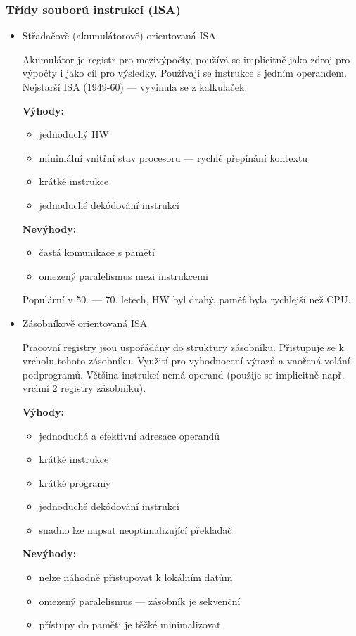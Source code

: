 \subsubsection*{Třídy souborů instrukcí (ISA)}
\begin{itemize}
	\item Střadačově (akumulátorově) orientovaná ISA

	Akumulátor je registr pro mezivýpočty, používá se implicitně jako zdroj pro výpočty i jako cíl pro výsledky. Používají se instrukce s jedním operandem. Nejstarší ISA (1949-60) --- vyvinula se z kalkulaček.
	
	\textbf{Výhody:}
	\begin{itemize}
		\item jednoduchý HW
		\item minimální vnitřní stav procesoru --- rychlé přepínání kontextu
		\item krátké instrukce
		\item jednoduché dekódování instrukcí
	\end{itemize}
	
	\textbf{Nevýhody:}
	\begin{itemize}
		\item častá komunikace s pamětí
		\item omezený paralelismus mezi instrukcemi
	\end{itemize}	
	
	Populární v 50. --- 70. letech, HW byl drahý, paměť byla rychlejší než CPU.
	
	\item Zásobníkově orientovaná ISA
	
	Pracovní registry jsou uspořádány do struktury zásobníku.
	Přistupuje se k vrcholu tohoto zásobníku.
	Využití pro vyhodnocení výrazů a vnořená volání podprogramů.
	Většina instrukcí nemá operand (použije se implicitně např. vrchní 2 registry zásobníku).
	
	\textbf{Výhody:}
	\begin{itemize}
		\item jednoduchá a efektivní adresace operandů
		\item krátké instrukce
		\item krátké programy
		\item jednoduché dekódování instrukcí
		\item snadno lze napsat neoptimalizující překladač
	\end{itemize}
	
	\textbf{Nevýhody:}
	\begin{itemize}
		\item nelze náhodně přistupovat k lokálním datům
		\item omezený paralelismus --- zásobník je sekvenční
		\item přístupy do paměti je těžké minimalizovat
	\end{itemize}
	

\end{itemize}
